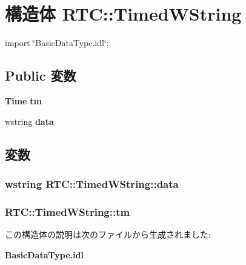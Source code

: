 \section{構造体 RTC::TimedWString}
\label{structRTC_1_1TimedWString}


{\ttfamily import \char`\"{}BasicDataType.idl\char`\"{};}

\subsection*{Public 変数}
\begin{DoxyCompactItemize}
\item 
{\bf Time} {\bf tm}
\item 
wstring {\bf data}
\end{DoxyCompactItemize}


\subsection{変数}
\subsubsection[{data}]{\setlength{\rightskip}{0pt plus 5cm}wstring {\bf RTC::TimedWString::data}}\label{structRTC_1_1TimedWString_a76845810bab01058afc6ed2fc1cffa6f}
\subsubsection[{tm}]{ {\bf RTC::TimedWString::tm}}\label{structRTC_1_1TimedWString_a4ecdff5eccaaa9cf9f5fee7234c484ce}


この構造体の説明は次のファイルから生成されました:\begin{DoxyCompactItemize}
\item 
{\bf BasicDataType.idl}\end{DoxyCompactItemize}
